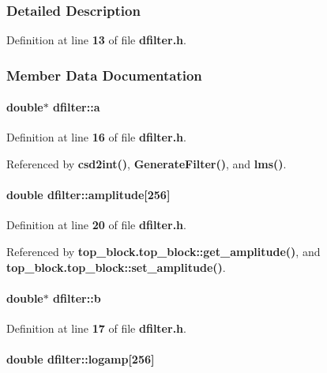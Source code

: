 \subsubsection{Detailed Description}


Definition at line {\bf 13} of file {\bf dfilter.\+h}.



\subsubsection{Member Data Documentation}
\paragraph[{a}]{\setlength{\rightskip}{0pt plus 5cm}double$\ast$ dfilter\+::a}\label{structdfilter_af6924cb5627afe62f76323182723f978}


Definition at line {\bf 16} of file {\bf dfilter.\+h}.



Referenced by {\bf csd2int()}, {\bf Generate\+Filter()}, and {\bf lms()}.

\paragraph[{amplitude}]{\setlength{\rightskip}{0pt plus 5cm}double dfilter\+::amplitude[256]}\label{structdfilter_afce5f85351b1250f974f9f34f0d9177c}


Definition at line {\bf 20} of file {\bf dfilter.\+h}.



Referenced by {\bf top\+\_\+block.\+top\+\_\+block\+::get\+\_\+amplitude()}, and {\bf top\+\_\+block.\+top\+\_\+block\+::set\+\_\+amplitude()}.

\paragraph[{b}]{\setlength{\rightskip}{0pt plus 5cm}double$\ast$ dfilter\+::b}\label{structdfilter_aee8e0e3b89088bb22e45e1ebf17aca26}


Definition at line {\bf 17} of file {\bf dfilter.\+h}.

\paragraph[{logamp}]{\setlength{\rightskip}{0pt plus 5cm}double dfilter\+::logamp[256]}\label{structdfilter_a505e15bb81d84cd7b603530a933ea0e2}


